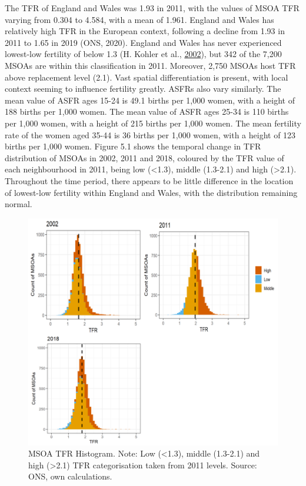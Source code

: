 \documentclass[12pt,twoside]{reedthesis}
\begin{document}
The TFR of England and Wales was 1.93 in 2011, with the values of MSOA TFR varying from 0.304 to 4.584, with a mean of 1.961. England and Wales has relatively high TFR in the European context, following a decline from 1.93 in 2011 to 1.65 in 2019 (ONS, 2020). England and Wales has never experienced lowest-low fertility of below 1.3 (H. Kohler et al., \protect\hyperlink{ref-kohler2002b}{2002}), but 342 of the 7,200 MSOAs are within this classification in 2011. Moreover, 2,750 MSOAs host TFR above replacement level (2.1). Vast spatial differentiation is present, with local context seeming to influence fertility greatly. ASFRs also vary similarly. The mean value of ASFR ages 15-24 is 49.1 births per 1,000 women, with a height of 188 births per 1,000 women. The mean value of ASFR ages 25-34 is 110 births per 1,000 women, with a height of 215 births per 1,000 women. The mean fertility rate of the women aged 35-44 is 36 births per 1,000 women, with a height of 123 births per 1,000 women. Figure 5.1 shows the temporal change in TFR distribution of MSOAs in 2002, 2011 and 2018, coloured by the TFR value of each neighbourhood in 2011, being low (\textless1.3), middle (1.3-2.1) and high (\textgreater2.1). Throughout the time period, there appears to be little difference in the location of lowest-low fertility within England and Wales, with the distribution remaining normal.
\begin{figure}
\includegraphics[width=0.95\linewidth]{figure/Figure_4} \caption{MSOA TFR Histogram. Note: Low (<1.3), middle (1.3-2.1) and high (>2.1) TFR categorisation taken from 2011 levels. Source: ONS, own calculations.}\label{fig:figure4}
\end{figure}
\end{document}
